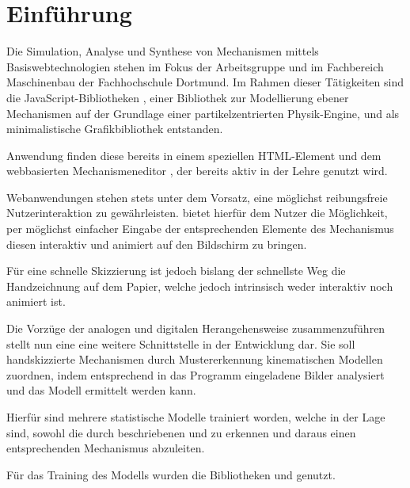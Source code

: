 \section{Einführung}
Die Simulation, Analyse und Synthese von Mechanismen mittels Basiswebtechnologien stehen im Fokus der Arbeitsgruppe  und  im Fachbereich Maschinenbau der Fachhochschule Dortmund.
Im Rahmen dieser Tätigkeiten sind die JavaScript-Bibliotheken \cite{Goessner2019}\cite{Goessner2019a}\cite{Goessner2018}, einer Bibliothek zur Modellierung ebener Mechanismen auf der Grundlage einer partikelzentrierten Physik-Engine, und \cite{Goessner2019b} als minimalistische Grafikbibliothek entstanden. 

Anwendung finden diese bereits in einem speziellen  HTML-Element und dem webbasierten Mechanismeneditor \cite{Uhlig2019}\cite{Uhlig2019a}, der bereits aktiv in der Lehre genutzt wird.

Webanwendungen stehen stets unter dem Vorsatz, eine möglichst reibungsfreie Nutzerinteraktion zu gewährleisten.
 bietet hierfür dem Nutzer die Möglichkeit, per möglichst einfacher Eingabe der entsprechenden Elemente des Mechanismus diesen interaktiv und animiert auf den Bildschirm zu bringen.

Für eine schnelle Skizzierung ist jedoch bislang der schnellste Weg die Handzeichnung auf dem Papier, welche jedoch intrinsisch weder interaktiv noch animiert ist.

Die Vorzüge der analogen und digitalen Herangehensweise zusammenzuführen stellt nun eine eine weitere Schnittstelle in der Entwicklung dar.
Sie soll handskizzierte Mechanismen durch Mustererkennung kinematischen Modellen zuordnen, indem entsprechend in das Programm eingeladene Bilder analysiert und das  Modell ermittelt werden kann.

Hierfür sind mehrere statistische Modelle trainiert worden, welche in der Lage sind, sowohl die durch  beschriebenen  und  zu erkennen und daraus einen entsprechenden Mechanismus abzuleiten.

Für das Training des Modells wurden die Bibliotheken \cite{Google2019} und \cite{Chollet2019}\cite{Chollet2017} genutzt.

